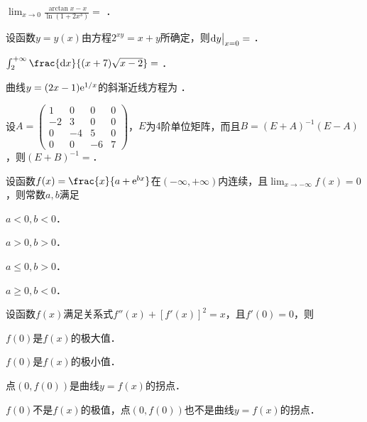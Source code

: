 \documentclass[plain,noanswer,medmath]{../../template/jnuexam}
\begin{document}






\begin{problem}
$\lim_{x \to 0} \frac{\arctan x - x}{\ln(1 + 2x^3)} =$ \fillin{}．
\end{problem}


\begin{problem}
设函数$y = y(x)$由方程$2^{xy} = x + y$所确定，则$\mathop{}\!\mathrm{d} y\big|_{x = 0} =$ \fillin{}．
\end{problem}


\begin{problem}
$\int_2^{+\infty} \frac{\dx}{(x + 7)\sqrt{x - 2}} =$ \fillin{}．
\end{problem}


\begin{problem}
曲线$y = (2x - 1)\mathrm{e}^{1/x}$的斜渐近线方程为 \fillin{}．
\end{problem}


\begin{problem}
设$A = \begin{pmatrix}
   1 &  0 &  0 & 0 \\
  -2 &  3 &  0 & 0 \\
   0 & -4 &  5 & 0 \\
   0 &  0 & -6 & 7
\end{pmatrix}$，$E$为$4$阶单位矩阵，而且$B = (E + A)^{-1}(E - A)$，则$(E + B)^{-1}=$\fillin{}．
\end{problem}




\begin{problem}
设函数$f(x) = \frac{x}{a + \e^{bx}}$在$(-\infty , +\infty)$内连续，且$\lim_{x \to -\infty} f(x) = 0$，则常数$a,b$满足 \pickout{}
\begin{abcd}
\item $a < 0,b < 0$．
\item $a > 0,b > 0$．
\item $a \le 0,b > 0$．
\item $a \ge 0,b < 0$．
\end{abcd}
\end{problem}


\begin{problem}
设函数$f(x)$满足关系式$f''(x) + [f'(x)]^2 = x$，且$f'(0) = 0$，则\pickout{}
\begin{abcd}
\item $f(0)$是$f(x)$的极大值．
\item $f(0)$是$f(x)$的极小值．
\item 点$(0,f(0))$是曲线$y = f(x)$的拐点．
\item $f(0)$不是$f(x)$的极值，点$(0,f(0))$也不是曲线$y = f(x)$的拐点．
\end{abcd}
\end{problem}
\end{document}
